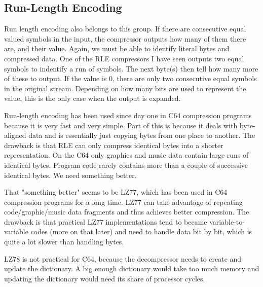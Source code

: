 \begin{frame}
\subsection*{Run-Length Encoding}

Run length encoding also belongs to this group. If there are consecutive equal valued symbols in the input, the compressor outputs how many of them there are, and their value. Again, we must be able to identify literal bytes and compressed data. One of the RLE compressors I have seen outputs two equal symbols to indentify a run of symbols. The next byte(s) then tell how many more of these to output. If the value is 0, there are only two consecutive equal symbols in the original stream. Depending on how many bits are used to represent the value, this is the only case when the output is expanded.

Run-length encoding has been used since day one in C64 compression programs because it is very fast and very simple. Part of this is because it deals with byte-aligned data and is essentially just copying bytes from one place to another. The drawback is that RLE can only compress identical bytes into a shorter representation. On the C64 only graphics and music data contain large runs of identical bytes. Program code rarely contains more than a couple of successive identical bytes. We need something better.

That "something better" seems to be LZ77, which has been used in C64 compression programs for a long time. LZ77 can take advantage of repeating code/graphic/music data fragments and thus achieves better compression. The drawback is that practical LZ77 implementations tend to became variable-to-variable codes (more on that later) and need to handle data bit by bit, which is quite a lot slower than handling bytes.

LZ78 is not practical for C64, because the decompressor needs to create and update the dictionary. A big enough dictionary would take too much memory and updating the dictionary would need its share of processor cycles.
\end{frame}
